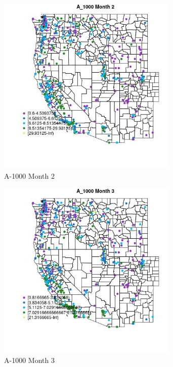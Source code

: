 \begin{figure} 
\centering  
\includegraphics[width=0.77\textwidth]{Code_Outputs/ML_input_report_ML_input_PM25_Step5_part_d_de_duplicated_aves_ML_input_MapObsMo2A_1000.jpg} 
\caption{\label{fig:ML_input_report_ML_input_PM25_Step5_part_d_de_duplicated_aves_ML_inputMapObsMo2A_1000}A-1000 Month 2} 
\end{figure} 
 

\begin{figure} 
\centering  
\includegraphics[width=0.77\textwidth]{Code_Outputs/ML_input_report_ML_input_PM25_Step5_part_d_de_duplicated_aves_ML_input_MapObsMo3A_1000.jpg} 
\caption{\label{fig:ML_input_report_ML_input_PM25_Step5_part_d_de_duplicated_aves_ML_inputMapObsMo3A_1000}A-1000 Month 3} 
\end{figure} 
 

